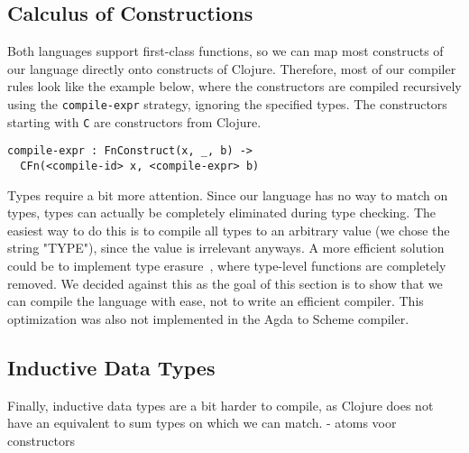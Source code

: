 \subsection{Calculus of Constructions}
Both languages support first-class functions, so we can map most constructs of our language directly onto constructs of Clojure. Therefore, most of our compiler rules look like the example below, where the constructors are compiled recursively using the \verb|compile-expr| strategy, ignoring the specified types. The constructors starting with \verb|C| are constructors from Clojure. 
\begin{lstlisting}
compile-expr : FnConstruct(x, _, b) -> 
  CFn(<compile-id> x, <compile-expr> b)
\end{lstlisting}

Types require a bit more attention. Since our language has no way to match on types, types can actually be completely eliminated during type checking. The easiest way to do this is to compile all types to an arbitrary value (we chose the string "TYPE"), since the value is irrelevant anyways. A more efficient solution could be to implement type erasure~\cite[Section 23.6]{tapl}, where type-level functions are completely removed. We decided against this as the goal of this section is to show that we can compile the language with ease, not to write an efficient compiler. This optimization was also not implemented in the Agda to Scheme compiler.

\subsection{Inductive Data Types}

Finally, inductive data types are a bit harder to compile, as Clojure does not have an equivalent to sum types on which we can match. 
- atoms voor constructors
